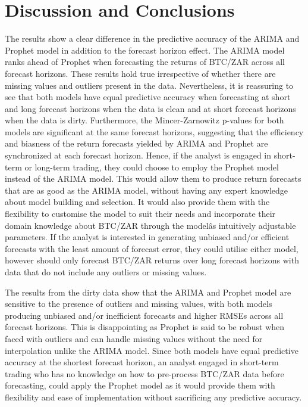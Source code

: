 \documentclass[12pt,a4paper]{article}
\numberwithin{equation}{section}
\numberwithin{figure}{section}
\numberwithin{table}{section}
\begin{document}
\section{\texorpdfstring{Discussion and Conclusions
\label{Discussion and Conclusions}}{Discussion and Conclusions }}\label{discussion-and-conclusions}

The results show a clear difference in the predictive accuracy of the
ARIMA and Prophet model in addition to the forecast horizon effect. The
ARIMA model ranks ahead of Prophet when forecasting the returns of
BTC/ZAR across all forecast horizons. These results hold true
irrespective of whether there are missing values and outliers present in
the data. Nevertheless, it is reassuring to see that both models have
equal predictive accuracy when forecasting at short and long forecast
horizons when the data is clean and at short forecast horizons when the
data is dirty. Furthermore, the Mincer-Zarnowitz p-values for both
models are significant at the same forecast horizons, suggesting that
the efficiency and biasness of the return forecasts yielded by ARIMA and
Prophet are synchronized at each forecast horizon. Hence, if the analyst
is engaged in short-term or long-term trading, they could choose to
employ the Prophet model instead of the ARIMA model. This would allow
them to produce return forecasts that are as good as the ARIMA model,
without having any expert knowledge about model building and selection.
It would also provide them with the flexibility to customise the model
to suit their needs and incorporate their domain knowledge about BTC/ZAR
through the modelâs intuitively adjustable parameters. If the analyst
is interested in generating unbiased and/or efficient forecasts with the
least amount of forecast error, they could utilise either model, however
should only forecast BTC/ZAR returns over long forecast horizons with
data that do not include any outliers or missing values.

The results from the dirty data show that the ARIMA and Prophet model
are sensitive to the presence of outliers and missing values, with both
models producing unbiased and/or inefficient forecasts and higher RMSEs
across all forecast horizons. This is disappointing as Prophet is said
to be robust when faced with outliers and can handle missing values
without the need for interpolation unlike the ARIMA model. Since both
models have equal predictive accuracy at the shortest forecast horizon,
an analyst engaged in short-term trading who has no knowledge on how to
pre-process BTC/ZAR data before forecasting, could apply the Prophet
model as it would provide them with flexibility and ease of
implementation without sacrificing any predictive accuracy.
\end{document}
